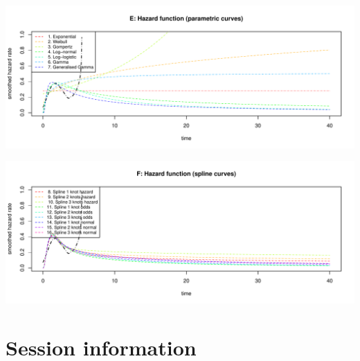 \documentclass[]{article}
\begin{document}
\begin{flushleft}\includegraphics[height=0.29\textheight]{Images/validate_extrapolation3-5} \end{flushleft}

\begin{flushleft}\includegraphics[height=0.29\textheight]{Images/validate_extrapolation3-6} \end{flushleft}

\newpage

\section{Session information}\label{session-information}
\end{document}
